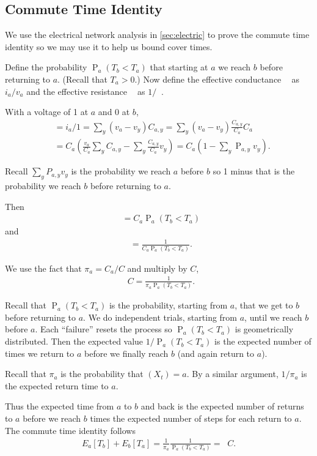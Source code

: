\documentclass[12pt]{article}
\theoremstyle{definition}
\DeclareMathOperator{\pr}{\mathrm{P}}		     %
\DeclareMathOperator{\Ceff}{C_\textrm{eff}}      %
\DeclareMathOperator{\Reff}{R_{\textrm{eff}}}    %
\begin{document}
\subsection{Commute Time Identity} \label{sec:commute}
We use the electrical network analysis in \cref{sec:electric} to 
prove the commute time identity so we may use it to help us bound
cover times.

Define the probability $\pr_a(T_b < T_a)$ that starting at $a$
we reach $b$ before returning to $a$.
(Recall that $T_a>0$.)
Now define the effective conductance $\Ceff$ as $i_a/v_a$
and the effective resistance $\Reff$ as $1/\Ceff$.

With a voltage of 1 at $a$ and 0 at $b$,
\begin{align}
\Ceff &= i_a/1 =
\sum_y (v_a - v_y) C_{a,y} =
\sum_y (v_a - v_y) \frac{C_{a,y}}{C_a} C_a \nonumber \\
&= C_a (\frac{v_a}{C_a} \sum_y C_{a,y} - \sum_y \frac{C_{a,y}}{C_a} v_y)=
C_a(1-\sum_y\pr_{a,y}v_y).\nonumber
\end{align}

Recall $\sum_y P_{a,y} v_y$ is the probability we reach $a$ before $b$
so 1 minus that is the probability we reach $b$ before returning to $a$.

Then
\begin{align}
\Ceff = C_a \pr_a(T_b < T_a) \nonumber
\end{align}
and
\begin{align}
\Reff = \frac{1}{C_a \pr_a(T_b < T_a)}. \nonumber
\end{align}

We use the fact that $\pi_a = C_a / C$ and multiply by $C$,
\begin{align}
\Reff C = \frac{1}{\pi_a \pr_a(T_b < T_a)}. \nonumber
\end{align}

Recall that $\pr_a(T_b < T_a)$ is the probability, starting from $a$,
that we get to $b$ before returning to $a$.
We do independent trials, starting from $a$, until we reach $b$ before $a$.
Each ``failure'' resets the process so $\pr_a(T_b < T_a)$ is geometrically distributed.
Then the expected value $1/\pr_a(T_b < T_a)$ is the expected number of times
we return to $a$ before we finally reach $b$ (and again return to $a$).

Recall that $\pi_a$ is the probability that $(X_t) = a$.
By a similar argument, $1/\pi_a$ is the expected return time to $a$.

Thus the expected time from $a$ to $b$ and back is
the expected number of returns to $a$ before we reach $b$ times
the expected number of steps for each return to $a$.
The commute time identity follows
\begin{align}
E_a[T_b] + E_b[T_a] = \frac{1}{\pi_a}\frac{1}{\pr_a(T_b < T_a)} = \Reff C.
\label{eqn:commute}
\end{align}
\end{document}
